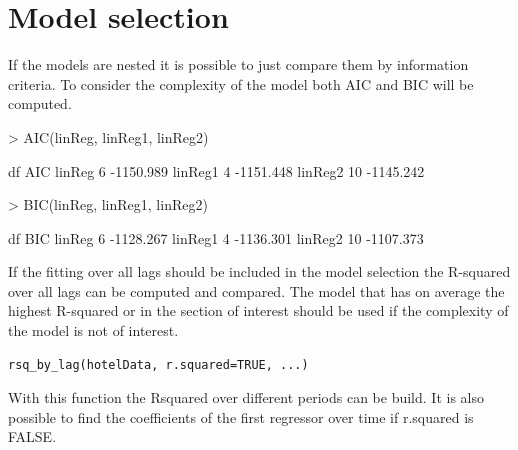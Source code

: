 \documentclass[nojss]{jss}
\begin{document}
\section{Model selection}

If the models are nested it is possible to just compare them by information criteria.
To consider the complexity of the model both AIC and BIC will be computed.

\begin{Schunk}
\begin{Sinput}
> AIC(linReg, linReg1, linReg2)
\end{Sinput}
\begin{Soutput}
        df       AIC
linReg   6 -1150.989
linReg1  4 -1151.448
linReg2 10 -1145.242
\end{Soutput}
\begin{Sinput}
> BIC(linReg, linReg1, linReg2)
\end{Sinput}
\begin{Soutput}
        df       BIC
linReg   6 -1128.267
linReg1  4 -1136.301
linReg2 10 -1107.373
\end{Soutput}
\end{Schunk}

If the fitting over all lags should be included in the model selection the R-squared over all lags can be computed and compared. The model that has on average the highest R-squared or in the section of interest should be used if the complexity of the model is not of interest.

\begin{verbatim}
rsq_by_lag(hotelData, r.squared=TRUE, ...)
\end{verbatim}

With this function the Rsquared over different periods can be build. It is also possible to find the coefficients of the first regressor over time if r.squared is FALSE.
\end{document}
